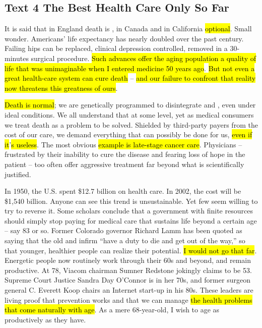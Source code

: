 \subsection{Text 4 The Best Health Care Only So Far}
It is said that in England death is 
, in Canada 
 and in California \hl{optional}. 
Small wonder. Americans’ life expectancy has nearly doubled over the past century. Failing hips can be replaced, clinical depression controlled,  removed in a 30-minutes surgical procedure. 
\hl{Such advances offer the aging population a quality of life that was unimaginable when I entered medicine 50 years ago}. 
\hl{But not even a great health-care system can cure death} -- \hl{and our failure to confront that reality now threatens this greatness of ours}.

\hl{Death is normal}; we are genetically programmed to disintegrate and , even under ideal conditions. We all understand that at some level, yet as medical consumers we treat death as a problem to be solved. 
Shielded by third-party payers from the cost of our care, we demand everything that can possibly be done for us, 
\hl{even if it}’\hl{s useless}. The most obvious \hl{example is late-stage cancer care}. Physicians -- frustrated by their inability to cure the disease and fearing loss of hope in the patient -- too often offer aggressive treatment far beyond what is scientifically justified.

In 1950, the U.S. spent \$12.7 billion on health care. In 2002, the cost will be \$1,540 billion. Anyone can see this trend is unsustainable. Yet few seem willing to try to reverse it. Some scholars conclude that a government with finite resources should simply stop paying for medical care that sustains life beyond a certain age -- say 83 or so. Former Colorado governor Richard Lamm has been quoted as saying that 
the old and infirm “have a duty to die and get out of the way,” so that younger, healthier people can realize their potential.
\hl{I would not go that far}. Energetic people now routinely work through their 60s and beyond, and remain 
 productive. At 78, Viacom chairman Sumner Redstone jokingly claims to be  53. Supreme Court Justice Sandra Day O’Connor is in her 70s, and former surgeon general C. Everett Koop chairs an Internet start-up in his 80s. These leaders are living proof that prevention works and that we can manage \hl{the health problems that come naturally with age}. As a mere 68-year-old, I wish to age as productively as they have.

